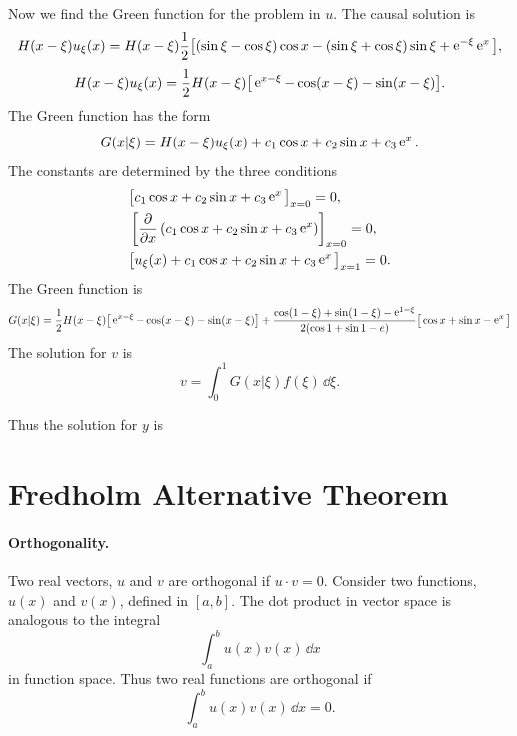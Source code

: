 \begin{Example}
  Now we find the Green function for the problem in $u$.  The causal 
  solution is
  \[
  H(x-\xi)u_\xi(x) = H(x-\xi) \frac{1}{2} \big[ (\sin\xi-\cos\xi)\cos x
  - (\sin\xi+\cos\xi)\sin\xi + \mathop{\mathrm{e}}\nolimits^{-\xi} \mathop{\mathrm{e}}\nolimits^x \big],
  \]
  \[
  H(x-\xi)u_\xi(x) = 
  \frac{1}{2} H(x-\xi) \big[ \mathop{\mathrm{e}}\nolimits^{x-\xi} - \cos(x-\xi) - \sin(x-\xi) \big].
  \]
  The Green function has the form
  \[
  G(x|\xi) = H(x-\xi)u_\xi(x) + c_1 \cos x + c_2 \sin x + c_3 \mathop{\mathrm{e}}\nolimits^x.
  \]
  The constants are determined by the three conditions
  \begin{align*}
    &\big[c_1 \cos x + c_2 \sin x + c_3 \mathop{\mathrm{e}}\nolimits^x \big]_{x=0} = 0, \\
    &\left[\frac{\partial}{\partial x}\left(c_1 \cos x + c_2 \sin x + c_3 \mathop{\mathrm{e}}\nolimits^x \right)
    \right]_{x=0} = 0, \\
    &\big[u_\xi(x) + c_1 \cos x + c_2 \sin x + c_3 \mathop{\mathrm{e}}\nolimits^x \big]_{x=1} = 0. 
  \end{align*}
  The Green function is
  \[
  G(x|\xi)=\frac{1}{2} H(x-\xi) \big[ \mathop{\mathrm{e}}\nolimits^{x-\xi} - \cos(x-\xi) - \sin(x-\xi) \big]
  + \frac{\cos(1-\xi)+\sin(1-\xi)-\mathop{\mathrm{e}}\nolimits^{1-\xi}}{2(\cos 1 + \sin 1 - e)}
  \big[ \cos x + \sin x - \mathop{\mathrm{e}}\nolimits^x \big]
  \]
  The solution for $v$ is 
  \[
  v = \int_0^1 G(x|\xi) f(\xi) \,\dd \xi.
  \]


  Thus the solution for $y$ is

  \begin{center}
  \end{center}
\end{Example}











\section{Fredholm Alternative Theorem}

\paragraph{Orthogonality.}
Two real vectors, $u$ and $v$ are orthogonal if $u \cdot v = 0$.  
Consider two functions, $u(x)$ and $v(x)$, defined in $[a,b]$.
The dot product in vector space is analogous to the integral
\[
\int_a^b u(x) v(x) \,\dd x
\]
in function space.  Thus two real functions are orthogonal if
\[
\int_a^b u(x) v(x) \,\dd x = 0.
\]





